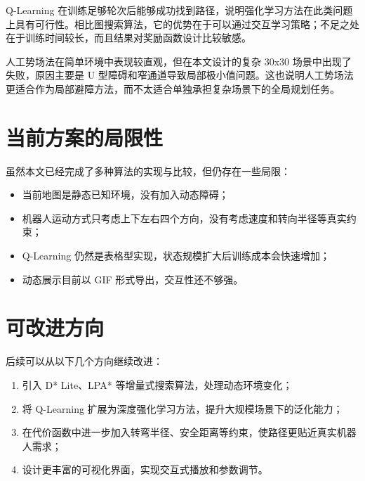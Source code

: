 Q-Learning 在训练足够轮次后能够成功找到路径，说明强化学习方法在此类问题上具有可行性。相比图搜索算法，它的优势在于可以通过交互学习策略；不足之处在于训练时间较长，而且结果对奖励函数设计比较敏感。

人工势场法在简单环境中表现较直观，但在本文设计的复杂 30x30 场景中出现了失败，原因主要是 U 型障碍和窄通道导致局部极小值问题。这也说明人工势场法更适合作为局部避障方法，而不太适合单独承担复杂场景下的全局规划任务。

\section{当前方案的局限性}

虽然本文已经完成了多种算法的实现与比较，但仍存在一些局限：

\begin{itemize}
  \item 当前地图是静态已知环境，没有加入动态障碍；
  \item 机器人运动方式只考虑上下左右四个方向，没有考虑速度和转向半径等真实约束；
  \item Q-Learning 仍然是表格型实现，状态规模扩大后训练成本会快速增加；
  \item 动态展示目前以 GIF 形式导出，交互性还不够强。
\end{itemize}

\section{可改进方向}

后续可以从以下几个方向继续改进：

\begin{enumerate}
  \item 引入 D* Lite、LPA* 等增量式搜索算法，处理动态环境变化；
  \item 将 Q-Learning 扩展为深度强化学习方法，提升大规模场景下的泛化能力；
  \item 在代价函数中进一步加入转弯半径、安全距离等约束，使路径更贴近真实机器人需求；
  \item 设计更丰富的可视化界面，实现交互式播放和参数调节。
\end{enumerate}
